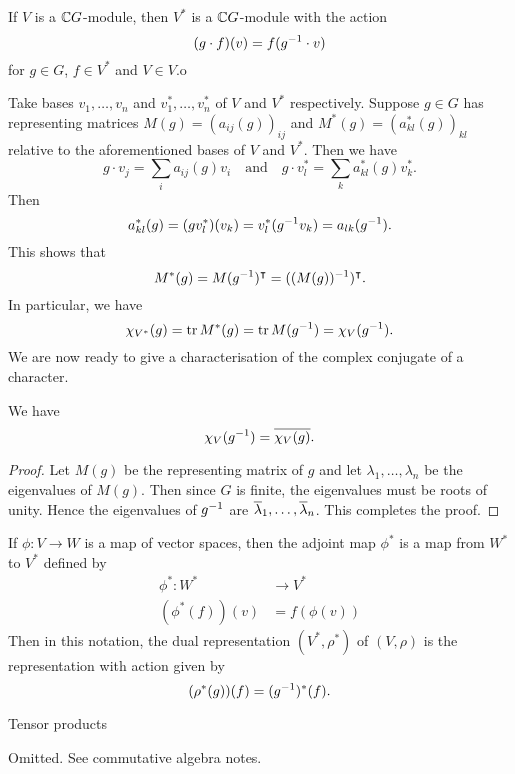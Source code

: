 \begin{rmk}
  If $V$ is a $\mathbb{C} G$-module, then $V^*$ is a $\mathbb{C} G$-module with the action
  \[(g \cdot f)(v) = f(g^{-1} \cdot v)\]
  for $g \in G$, $f \in V^*$ and $V \in V$.o
  
  Take bases $v_1,\ldots,v_n$ and $v_1^*,\ldots,v_n^*$ of $V$ and $V^*$ respectively.
  Suppose $g \in G$ has representing matrices $M(g)=(a_{ij}(g))_{ij}$ and $M^*(g)=(a^*_{kl}(g))_{kl}$ relative to the aforementioned bases of $V$ and $V^*$.
  Then we have
  \[g \cdot v_j = \sum_i a_{ij}(g) v_i \quad\text{and}\quad g \cdot v_l^* = \sum_k a_{kl}^*(g) v_k^*.\]
  Then
  \[a_{kl}^*(g) = (gv_l^*)(v_k) = v_l^*(g^{-1} v_k) = a_{lk}(g^{-1}).\]
  This shows that
  \[M^*(g) = M(g^{-1})^\intercal = ((M(g))^{-1})^\intercal.\]
  In particular, we have
  \[\chi_{V^*}(g) = \operatorname{tr} M^*(g) = \operatorname{tr} M(g^{-1}) = \chi_V(g^{-1}).\]
  We are now ready to give a characterisation of the complex conjugate of a character.
\end{rmk}

\begin{prop}
  We have
  \[\chi_V(g^{-1}) = \overline{\chi_V(g)}.\]
\end{prop}

\begin{proof}
  Let $M(g)$ be the representing matrix of $g$ and let $\lambda_1,\ldots,\lambda_n$ be the eigenvalues of $M(g)$.
  Then since $G$ is finite, the eigenvalues must be roots of unity.
  Hence the eigenvalues of $g^{-1}$ are $\overline\lambda_1,\ldots,\overline\lambda_n$.
  This completes the proof.
\end{proof}

\begin{rmk}
  If $\phi: V \to W$ is a map of vector spaces, then the adjoint map $\phi^*$ is a map from $W^*$ to $V^*$ defined by
  \begin{align*}
    \phi^*: W^* &\to V^* \\
    (\phi^*(f))(v) &= f(\phi(v))
  \end{align*}
  Then in this notation, the dual representation $(V^*,\rho^*)$ of $(V,\rho)$ is the representation with action given by
  \[(\rho^*(g))(f) = (g^{-1})^*(f).\]
\end{rmk}

Tensor products

Omitted.
See commutative algebra notes.
